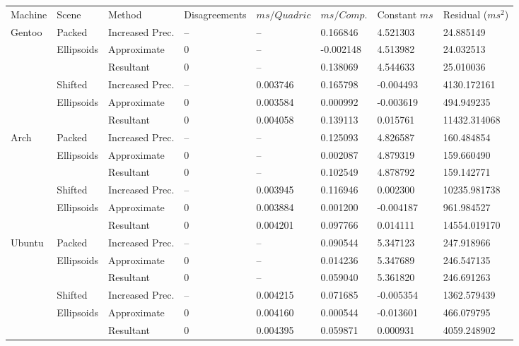 \begin{tabular}{|l|l|ll|lll|l|}
\hline
Machine & Scene & Method & Disagreements & $ms/Quadric$ & $ms/Comp.$ & Constant $ms$ & Residual ($ms^2$)\\
\hhline{|=|=|==|===|=|}
Gentoo & Packed & Increased Prec. & -- & -- & 0.166846 & 4.521303 & 24.885149\\
& Ellipsoids & Approximate & 0 & -- & -0.002148 & 4.513982 & 24.032513\\
&& Resultant & 0 & -- & 0.138069 & 4.544633 & 25.010036\\
\hline
& Shifted & Increased Prec. & -- & 0.003746 & 0.165798 & -0.004493 & 4130.172161\\
& Ellipsoids & Approximate & 0 & 0.003584 & 0.000992 & -0.003619 & 494.949235\\
&& Resultant & 0 & 0.004058 & 0.139113 & 0.015761 & 11432.314068\\
\hline
Arch & Packed & Increased Prec. & -- & -- & 0.125093 & 4.826587 & 160.484854\\
& Ellipsoids & Approximate & 0 & -- & 0.002087 & 4.879319 & 159.660490\\
&& Resultant & 0 & -- & 0.102549 & 4.878792 & 159.142771\\
\hline
& Shifted & Increased Prec. & -- & 0.003945 & 0.116946 & 0.002300 & 10235.981738\\
& Ellipsoids & Approximate & 0 & 0.003884 & 0.001200 & -0.004187 & 961.984527\\
&& Resultant & 0 & 0.004201 & 0.097766 & 0.014111 & 14554.019170\\
\hline
Ubuntu & Packed & Increased Prec. & -- & -- & 0.090544 & 5.347123 & 247.918966\\
& Ellipsoids & Approximate & 0 & -- & 0.014236 & 5.347689 & 246.547135\\
&& Resultant & 0 & -- & 0.059040 & 5.361820 & 246.691263\\
\hline
& Shifted & Increased Prec. & -- & 0.004215 & 0.071685 & -0.005354 & 1362.579439\\
& Ellipsoids & Approximate & 0 & 0.004160 & 0.000544 & -0.013601 & 466.079795\\
&& Resultant & 0 & 0.004395 & 0.059871 & 0.000931 & 4059.248902\\
\hline
\end{tabular}
